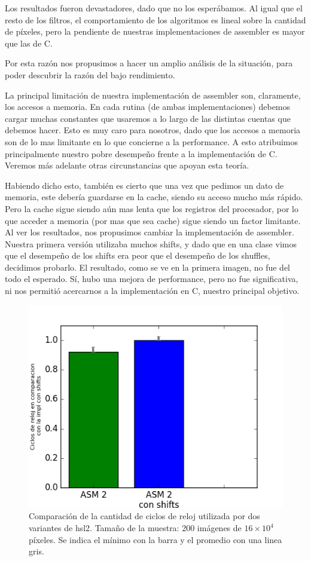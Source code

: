 Los resultados fueron devastadores, dado que no los esperábamos. Al igual que el resto de los filtros, el comportamiento de los algoritmos es lineal sobre la cantidad de píxeles, pero la pendiente de nuestras implementaciones de assembler es mayor que las de C.

Por esta razón nos propusimos a hacer un amplio análisis de la situación, para poder descubrir la razón del bajo rendimiento.

La principal limitación de nuestra implementación de assembler son, claramente, los accesos a memoria. En cada rutina (de ambas implementaciones) debemos cargar muchas constantes que usaremos a lo largo de las distintas cuentas que debemos hacer.
Esto es muy caro para nosotros, dado que los accesos a memoria son de lo mas limitante en lo que concierne a la performance. 
A esto atribuimos principalmente nuestro pobre desempeño frente a la implementación de C. Veremos más adelante otras circunstancias que apoyan esta teoría.

Habiendo dicho esto, también es cierto que una vez que pedimos un dato de memoria, este debería guardarse en la cache, siendo su acceso mucho más rápido. Pero la cache sigue siendo aún mas lenta que los registros del procesador, por lo que acceder a memoria (por mas que sea cache) sigue siendo un factor limitante.
\\

Al ver los resultados, nos propusimos cambiar la implementación de assembler. Nuestra primera versión utilizaba muchos shifts, y dado que en una clase vimos que el desempeño de los shifts era peor que el desempeño de los shuffles, decidimos probarlo. El resultado, como se ve en la primera imagen, no fue del todo el esperado. Sí, hubo una mejora de performance, pero no fue significativa, ni nos permitió acercarnos a la implementación en C, nuestro principal objetivo.


\begin{figure}[!hbt] 
	\centering
  \includegraphics[scale=0.7]{hsl-shsh.png}
  \caption{Comparación de la cantidad de ciclos de reloj utilizada por dos variantes de hsl2. Tamaño de la muestra: 200 imágenes de $16 \times 10^4$ píxeles. Se indica el mínimo con la barra y el promedio con una linea gris.}
\end{figure}

